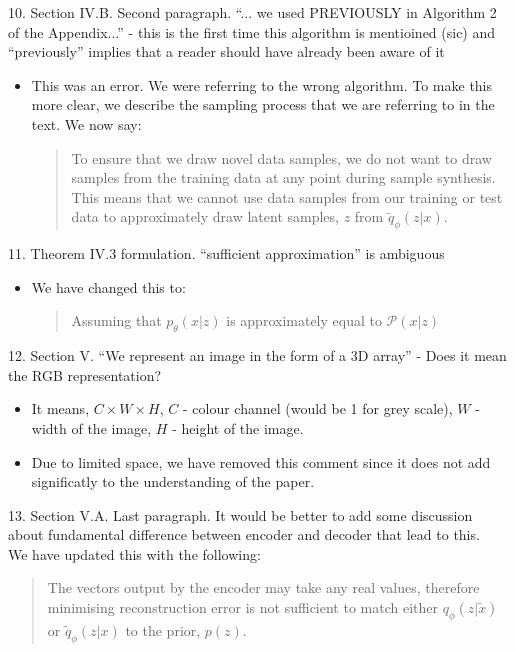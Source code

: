 \documentclass[a4paper,11pt]{article}
\begin{document}
{\color{blue}
10. Section IV.B. Second paragraph. ``... we used PREVIOUSLY in Algorithm 2 of the Appendix...'' - this is the first time this algorithm is mentioined (sic) and ``previously'' implies that a reader should have already been aware of it}
\begin{itemize}
    \item This was an error. We were referring to the wrong algorithm. To make this more clear, we describe the sampling process that we are referring to in the text. We now say:
    \begin{quote}
        {\color{red} To ensure that we draw novel data samples, we do not want to draw samples from the training data at any point during sample synthesis. This means that we cannot use data samples from our training or test data to approximately draw latent samples, $z$ from $\tilde{q}_\phi(z|x)$.}
    \end{quote} 
\end{itemize}

{\color{blue}
11. Theorem IV.3 formulation. ``sufficient approximation'' is ambiguous}
\begin{itemize}
    \item We have changed this to:
    \begin{quote}
        {\color{red} Assuming that $p_\theta(x|z)$ is approximately equal to $\mathcal{P}(x|z)$}
    \end{quote}
\end{itemize}

{\color{blue}
12. Section V. ``We represent an image in the form of a 3D array'' - Does it mean the RGB representation?}
\begin{itemize}
    \item It means, $C \times W \times H$, $C$ - colour channel (would be 1 for grey scale), $W$ - width of the image, $H$ - height of the image.
    \item Due to limited space, we have removed this comment since it does not add significatly to the understanding of the paper.
\end{itemize}

{\color{blue}
13. Section V.A. Last paragraph. It would be better to add some discussion about fundamental difference between encoder and decoder that lead to this.}\\

We have updated this with the following:
\begin{quote}
{\color{red}The vectors output by the encoder may take any real values, therefore minimising reconstruction error is not sufficient to match either $q_\phi(z|\tilde{x})$ or $\tilde{q}_\phi(z|x)$ to the prior, $p(z)$. 
}\end{quote}
\end{document}
